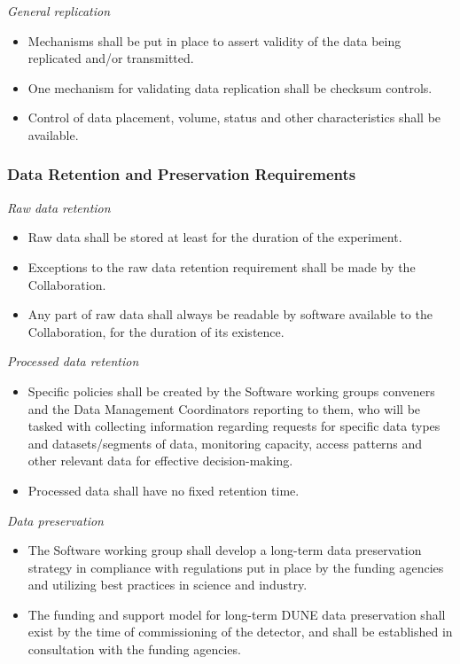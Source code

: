 \noindent
\textit{General replication}

\begin{itemize}
\item Mechanisms shall be put in place to assert validity of the data being replicated and/or transmitted.

\item One mechanism for validating data replication shall be checksum controls.

\item Control of data placement, volume, status and other characteristics shall be available.
\end{itemize}

\subsubsection{Data Retention and Preservation Requirements}
\textit{Raw data retention}
\begin{itemize}
\item Raw data shall be stored at least for the duration of the experiment.

\item Exceptions to the raw data retention requirement shall be made by the Collaboration.

\item Any part of raw data shall always be readable by software available to the Collaboration, for the duration of its existence.

\end{itemize}
\noindent
\textit{Processed data retention}
\begin{itemize}
\item Specific policies shall be created by the Software working groups conveners and the
Data Management Coordinators reporting to them, who will be tasked with collecting information
regarding requests for specific data types and datasets/segments of data, monitoring capacity,
access patterns and other relevant data for effective decision-making. 

\item Processed data shall have no fixed retention time.
\end{itemize}
\noindent
\textit{Data preservation}
\label{sec:dunepres}
\begin{itemize}
\item The Software working group shall develop a long-term data preservation strategy in compliance with regulations put in place by the funding agencies and utilizing best practices in science and industry.

\item The funding and support model for long-term DUNE data preservation shall exist by the time of commissioning of the detector, and shall be established in consultation with the funding agencies.
\end{itemize}

